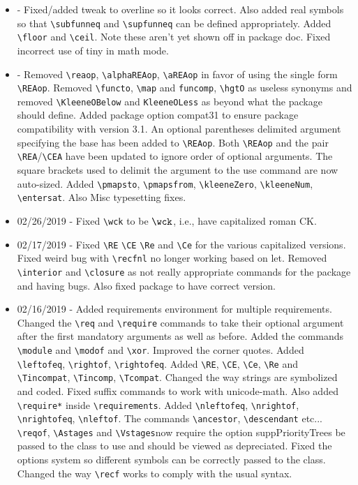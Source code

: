 \documentclass[leqno,11pt]{amsart}
\begin{document}
\begin{itemize}
	\item[3.3]  - Fixed/added tweak to overline so it looks correct.  Also added real symbols so that \verb=\subfunneq= and \verb=\supfunneq= can be defined appropriately.  Added \verb=\floor= and \verb=\ceil=.  Note these aren't yet shown off in package doc.  Fixed incorrect use of tiny in math mode.
	\item[3.2]	- Removed \verb=\reaop=, \verb=\alphaREAop=, \verb=\aREAop= in favor of using the single form \verb=\REAop=.  Removed \verb=\functo=, \verb=\map= and \verb=funcomp=, \verb=\hgtO= as useless synonyms and removed \verb=\KleeneOBelow= and \verb=KleeneOLess= as beyond what the package should define. Added package option compat31 to ensure package compatibility with version 3.1.  An optional parentheses delimited argument specifying the base has been added to  \verb=\REAop=.  Both \verb=\REAop= and the pair \verb=\REA=/\verb=\CEA= have been updated to ignore order of optional arguments.  The square brackets used to delimit the argument to the use command are now auto-sized.  Added \verb=\pmapsto=, \verb=\pmapsfrom=, \verb=\kleeneZero=, \verb=\kleeneNum=, \verb=\entersat=.  Also Misc typesetting fixes.  
	\item[3.1]  02/26/2019 - Fixed \verb=\wck= to be \( \wck \), i.e., have capitalized roman CK.
	\item[3.01] 02/17/2019 - Fixed \verb=\RE= \verb=\CE= \verb=\Re= and \verb=\Ce= for the various capitalized versions.  Fixed weird bug with \verb=\recfnl= no longer working based on let.  Removed \verb=\interior= and \verb=\closure= as not really appropriate commands for the package and having bugs.  Also fixed package to have correct version.
	\item[3.0] 02/16/2019 - Added requirements environment for multiple requirements.  Changed the \verb=\req= and \verb=\require= commands to take their optional argument after the first mandatory arguments as well as before.  Added the commands \verb=\module= and \verb=\modof= and \verb=\xor=.  Improved the corner quotes. Added \verb=\leftofeq=, \verb=\rightof=, \verb=\rightofeq=.  Added \verb=\RE=, \verb=\CE=, \verb=\Ce=, \verb=\Re= and  \verb=\Tincompat=, \verb=\Tincomp=, \verb=\Tcompat=.  Changed the way strings are symbolized and coded.  Fixed suffix commands to work with unicode-math.  Also added \verb=\require*= inside \verb=\requirements=. Added \verb=\nleftofeq=, \verb=\nrightof=, \verb=\nrightofeq=, \verb=\nleftof=.  The commands \verb=\ancestor=, \verb=\descendant= etc... \verb=\reqof=, \verb=\Astages= and \verb=\Vstages=now require the option suppPriorityTrees be passed to the class to use and should be viewed as depreciated.  Fixed the options system so different symbols can be correctly passed to the class.    Changed the way \verb=\recf= works to comply with the usual syntax.

\end{itemize}
\end{document}
